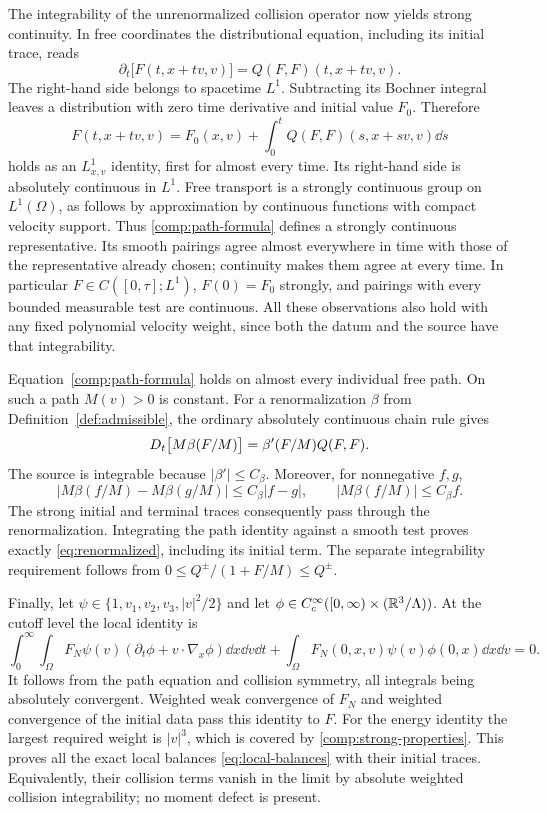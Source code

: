 The integrability of the unrenormalized collision operator now yields
strong continuity. In free coordinates the distributional equation,
including its initial trace, reads
\[
 \partial_t\bigl[F(t,x+tv,v)\bigr]=Q(F,F)(t,x+tv,v).
\]
The right-hand side belongs to spacetime $L^1$.
Subtracting its Bochner integral leaves a distribution with zero time
derivative and initial value $F_0$. Therefore
\begin{equation}\label{comp:path-formula}
 F(t,x+tv,v)=F_0(x,v)
       +\int_0^t Q(F,F)(s,x+sv,v)\dd s
\end{equation}
holds as an $L^1_{x,v}$ identity, first for almost every time.
Its right-hand side is absolutely continuous in $L^1$.
Free transport is a strongly continuous group on $L^1(\Omega)$,
as follows by approximation by continuous functions with compact
velocity support. Thus \eqref{comp:path-formula} defines a strongly
continuous representative. Its smooth pairings agree almost
everywhere in time with those of the representative already chosen;
continuity makes them agree at every time.
In particular $F\in C([0,\tau];L^1)$, $F(0)=F_0$ strongly, and
pairings with every bounded measurable test are continuous.
All these observations also hold with any fixed polynomial velocity
weight, since both the datum and the source have that integrability.

Equation~\eqref{comp:path-formula} holds on almost every individual
free path. On such a path $M(v)>0$ is constant. For a renormalization
$\beta$ from Definition~\ref{def:admissible}, the ordinary absolutely
continuous chain rule gives
\[
 D_t\bigl[M\beta(F/M)\bigr]=\beta'(F/M)Q(F,F).
\]
The source is integrable because $|\beta'|\le C_\beta$.
Moreover, for nonnegative $f,g$,
\[
 |M\beta(f/M)-M\beta(g/M)|\le C_\beta|f-g|,
 \qquad |M\beta(f/M)|\le C_\beta f.
\]
The strong initial and terminal traces consequently pass through the
renormalization. Integrating the path identity against a smooth test
proves exactly \eqref{eq:renormalized}, including its initial term.
The separate integrability requirement follows from
$0\le Q^\pm/(1+F/M)\le Q^\pm$.

Finally, let
$\psi\in\{1,v_1,v_2,v_3,|v|^2/2\}$ and let
$\phi\in C_c^\infty([0,\infty)\times(\mathbb R^3/\Lambda))$.
At the cutoff level the local identity is
\[
 \int_0^\infty\!\int_\Omega
 F_N\psi(v)(\partial_t\phi+v\cdot\nabla_x\phi)
 \dd x\dd v\dd t
 +\int_\Omega F_N(0,x,v)\psi(v)\phi(0,x)\dd x\dd v=0.
\]
It follows from the path equation and collision symmetry, all integrals
being absolutely convergent. Weighted weak convergence of $F_N$ and
weighted convergence of the initial data pass this identity to $F$.
For the energy identity the largest required weight is $|v|^3$,
which is covered by \eqref{comp:strong-properties}.
This proves all the exact local balances \eqref{eq:local-balances}
with their initial traces. Equivalently, their collision terms vanish
in the limit by absolute weighted collision integrability; no
moment defect is present.


